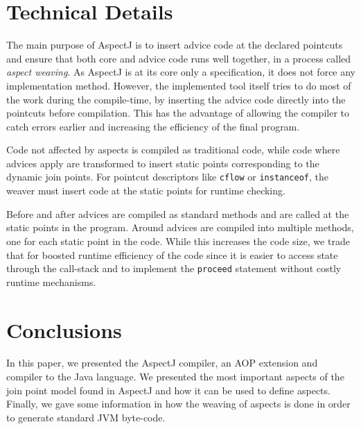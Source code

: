 \documentclass{template}
\begin{document}

\section{Technical Details}

The main purpose of AspectJ is to insert advice code at the declared pointcuts and ensure that
both core and advice code runs well together, in a process called \emph{aspect weaving}.
As AspectJ is at its core only a specification, it does not force any implementation method.
However, the implemented tool itself tries to do most of the work during the compile-time, by
inserting the advice code directly into the pointcuts before compilation. This has the advantage of
allowing the compiler to catch errors earlier and increasing the efficiency of the final program.

Code not affected by aspects is compiled as traditional code, while code where advices apply are
transformed to insert static points corresponding to the dynamic join points.
For pointcut descriptors like \texttt{cflow} or \texttt{instanceof}, the weaver must insert
code at the static points for runtime checking.

Before and after advices are compiled as standard methods and are called at the static points in
the program. Around advices are compiled into multiple methods, one for each static point in the code.
While this increases the code size, we trade that for boosted runtime efficiency of the code since
it is easier to access state through the call-stack and to implement the \texttt{proceed} statement
without costly runtime mechanisms.

\section{Conclusions}

In this paper, we presented the AspectJ compiler, an AOP extension and compiler to the Java language.
We presented the most important aspects of the join point model found in AspectJ and how it can be used
to define aspects. Finally, we gave some information in how the weaving of aspects is done in order to
generate standard JVM byte-code.




\balancecolumns
\end{document}
